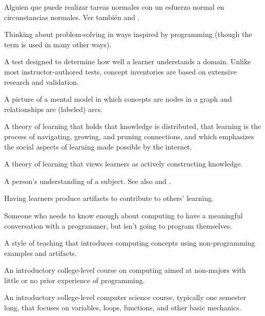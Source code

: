 \begin{description}
 Alguien que puede 
realizar tareas normales con un esfuerzo normal en circunstancias normales. Ver también
 and .

 Thinking about
problem-solving in ways inspired by programming (though the term is used in many
other ways).

 A test designed to determine
how well a learner understands a domain.  Unlike most instructor-authored tests,
concept inventories are based on extensive research and validation.

 A picture of a mental model in which
concepts are nodes in a graph and relationships are (labeled) arcs.

 A theory of learning that holds that knowledge
is distributed, that learning is the process of navigating, growing, and pruning
connections, and which emphasizes the social aspects of learning made possible
by the internet.

 A theory of learning that views
learners as actively constructing knowledge.

 A person's understanding of a
subject. See also
and .

 Having learners
produce artifacts to contribute to others' learning.

 Someone who
needs to know enough about computing to have a meaningful conversation with a
programmer, but isn't going to program themselves.

 A style of teaching that introduces
computing concepts using non-programming examples and artifacts.

 An introductory college-level course on computing aimed at
non-majors with little or no prior experience of programming.

 An introductory college-level computer science course,
typically one semester long, that focuses on variables, loops, functions, and
other basic mechanics.


\end{description}
